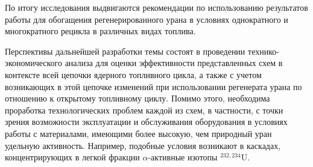 По итогу исследования выдвигаются рекомендации по использованию результатов работы для обогащения регенерированного урана в условиях однократного и многократного рецикла в различных видах топлива.

Перспективы дальнейшей разработки темы состоят в проведении технико-экономического анализа для оценки эффективности представленных схем в контексте всей цепочки ядерного топливного цикла, а также с учетом возникающих в этой цепочке изменений при использовании регенерата урана по отношению к открытому топливному циклу. Помимо этого, необходима проработка технологических проблем каждой из схем, в частности, с точки зрения возможности эксплуатации и обслуживания оборудования в условиях работы с материалами, имеющими более высокую, чем природный уран удельную активность. Например, подобные условия возникают в каскадах, концентрирующих в легкой фракции $\alpha$-активные изотопы $^{232,234}$U.



\insertbibliofull   



